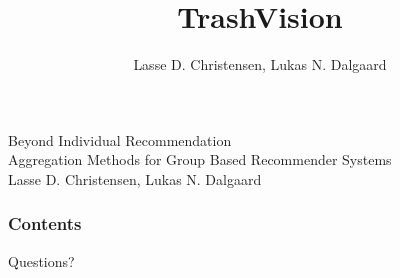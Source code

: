 \documentclass[10pt, hyperref={bookmarks=false}, show notes]{beamer}
\date
\begin{document}

\title[Beyond Individual Recommendation]{TrashVision}
\author[\insertframenumber /\inserttotalframenumber]{Lasse D. Christensen, Lukas N. Dalgaard}

\begin{frame}
\Large Beyond Individual Recommendation\\
\normalsize Aggregation Methods for Group Based Recommender Systems \\
\small Lasse D. Christensen, Lukas N. Dalgaard\\
\end{frame}

\begin{frame}
  \frametitle{Contents}
  \tableofcontents
\end{frame}





%
%
%

\begin{frame}
\centering
\huge Questions?
\end{frame}



\section*{}
\end{document}
